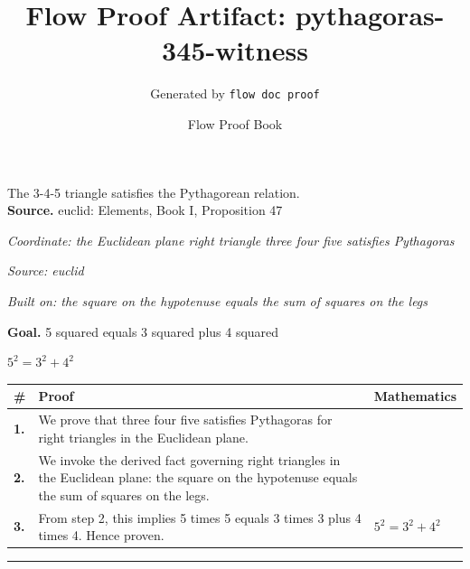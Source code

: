 \documentclass[11pt]{article}
\title{Flow Proof Artifact: pythagoras-345-witness}
\author{Generated by \texttt{flow doc proof}}
\date{Flow Proof Book}
\theoremstyle{definition}
\begin{document}
\maketitle
The 3-4-5 triangle satisfies the Pythagorean relation.\\[0.5em]
\textbf{Source.} euclid: Elements, Book I, Proposition 47\\[0.5em]
\bigskip
{}\par
\smallskip\noindent\textit{Coordinate: the Euclidean plane \cdot right triangle \cdot three four five satisfies Pythagoras}\par
\smallskip\noindent\textit{Source: euclid}\par
\smallskip\noindent\textit{Built on: the square on the hypotenuse equals the sum of squares on the legs}\par
\medskip
\noindent\textbf{Goal.} 5 squared equals 3 squared plus 4 squared\par
\noindent$\displaystyle 5^{2} = 3^{2} + 4^{2}$\par
\medskip
\noindent
\begin{tabular}{@{} >{\raggedright\arraybackslash}p{} >{\raggedright\arraybackslash}p{} >{\raggedleft\arraybackslash}p{} @{}}
\textbf{\#} & \textbf{Proof} & \textbf{Mathematics} \\
\midrule
\textbf{1.} & We prove that three four five satisfies Pythagoras for right triangles in the Euclidean plane. & \\[0.45em]
\textbf{2.} & We invoke the derived fact governing right triangles in the Euclidean plane: the square on the hypotenuse equals the sum of squares on the legs. & \\[0.45em]
\textbf{3.} & From step 2, this implies 5 times 5 equals 3 times 3 plus 4 times 4. Hence proven. & $\displaystyle 5^{2} = 3^{2} + 4^{2}$ \\[0.45em]
\bottomrule
\end{tabular}
\label{thm:Geometry-right triangle-three_four_five_satisfies_pythagoras}
\par\medskip\hrule
\end{document}
